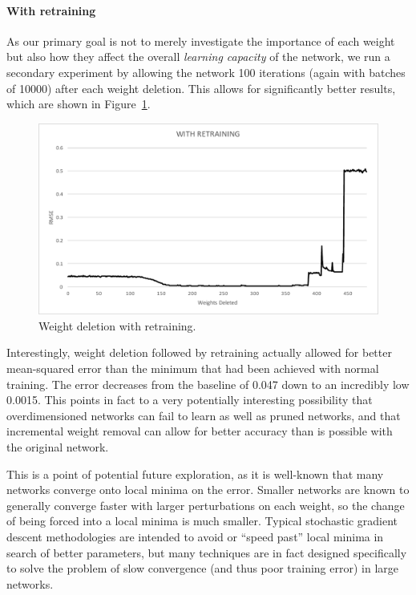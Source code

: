 \documentclass[10pt,twocolumn,letterpaper]{article}
\begin{document}
\paragraph{With retraining} As our primary goal is not to merely investigate the importance of each weight but also how they affect the overall \emph{learning capacity} of the network, we run a secondary experiment by allowing the network 100 iterations (again with batches of 10000) after each weight deletion.
This allows for significantly better results, which are shown in Figure~\ref{fig:sin-with}.


\begin{figure}[h]
  \centering
  \includegraphics[width=\linewidth]{sin-with-retraining.pdf}
  \caption{Weight deletion with retraining.}
  \label{fig:sin-with}
\end{figure}

Interestingly, weight deletion followed by retraining actually allowed for better mean-squared error than the minimum that had been achieved with normal training.
The error decreases from the baseline of 0.047 down to an incredibly low 0.0015.
This points in fact to a very potentially interesting possibility that overdimensioned networks can fail to learn as well as pruned networks, and that incremental weight removal can allow for better accuracy than is possible with the original network.

This is a point of potential future exploration, as it is well-known that many networks converge onto local minima on the error.
Smaller networks are known to generally converge faster with larger perturbations on each weight, so the change of being forced into a local minima is much smaller.
Typical stochastic gradient descent methodologies are intended to avoid or ``speed past'' local minima in search of better parameters, but many techniques are in fact designed specifically to solve the problem of slow convergence (and thus poor training error) in large networks.
\end{document}

